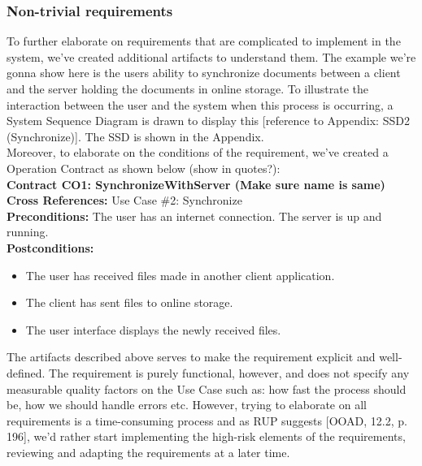 \subsubsection{Non-trivial requirements}
To further elaborate on requirements that are complicated to implement in the system, we’ve created additional artifacts to understand them. The example we’re gonna show here is the users ability to synchronize documents between a client and the server holding the documents in online storage. To illustrate the interaction between the user and the system when this process is occurring, a System Sequence Diagram is drawn to display this [reference to Appendix: SSD2 (Synchronize)]. The SSD is shown in the Appendix.\\
Moreover, to elaborate on the conditions of the requirement, we’ve created a Operation Contract as shown below (show in quotes?):\\
\indent \textbf{Contract CO1: SynchronizeWithServer (Make sure name is same)}\\
\indent \textbf{Cross References:} Use Case \#2: Synchronize\\
\indent \textbf{Preconditions:} The user has an internet connection. The server is up and running.\\
\indent \textbf{Postconditions:}
\begin{itemize}
\item The user has received files made in another client application.
\item The client has sent files to online storage.
\item The user interface displays the newly received files.
\end{itemize}
The artifacts described above serves to make the requirement explicit and well-defined. The requirement is purely functional, however, and does not specify any measurable quality factors on the Use Case such as: how fast the process should be, how we should handle errors etc. However, trying to elaborate on all requirements is a time-consuming process and as RUP suggests [OOAD, 12.2, p. 196], we’d rather start implementing the high-risk elements of the requirements, reviewing and adapting the requirements at a later time. \\
